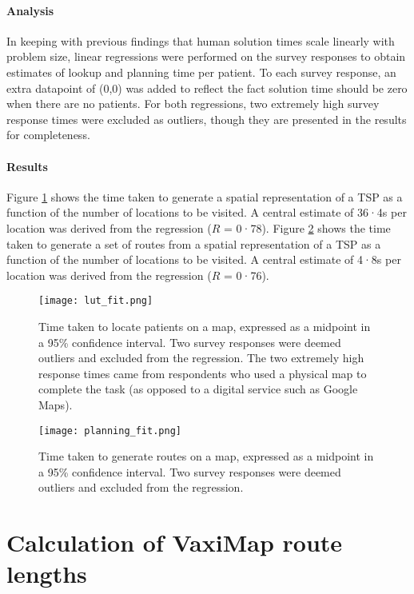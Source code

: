 \documentclass{article}
\def\vm{VaxiMap}
\begin{document}
\paragraph{Analysis} In keeping with previous findings that human solution times scale linearly with problem size, linear regressions were performed on the survey responses to obtain estimates of lookup and planning time per patient. To each survey response, an extra datapoint of (0,0) was added to reflect the fact solution time should be zero when there are no patients. For both regressions, two extremely high survey response times were excluded as outliers, though they are presented in the results for completeness. 

\paragraph{Results} Figure \ref{lut_fit} shows the time taken to generate a spatial representation of a TSP as a function of the number of locations to be visited. A central estimate of 36·4s per location was derived from the regression ($R$ = 0·78). Figure \ref{planning_fit} shows the time taken to generate a set of routes from a spatial representation of a TSP as a function of the number of locations to be visited. A central estimate of 4·8s per location was derived from the regression ($R$ = 0·76). 

\begin{figure}[H]
\centering
\texttt{[image: lut\_fit.png]}
\caption{Time taken to locate patients on a map, expressed as a midpoint in a 95\% confidence interval. Two survey responses were deemed outliers and excluded from the regression. The two extremely high response times came from respondents who used a physical map to complete the task (as opposed to a digital service such as Google Maps).}
\label{lut_fit}
\end{figure}

\begin{figure}[H]
\centering
\texttt{[image: planning\_fit.png]}
\caption{Time taken to generate routes on a map, expressed as a midpoint in a 95\% confidence interval. Two survey responses were deemed outliers and excluded from the regression.}
\label{planning_fit}
\end{figure}

\section{Calculation of \vm{} route lengths}
\end{document}
